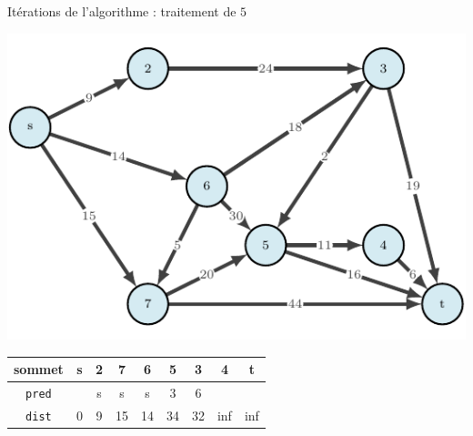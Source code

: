 \begin{frame}{Itérations de l'algorithme : traitement de $5$}
    \begin{center}
        \includegraphics[height=.6\textheight]{fig/ordinal-0.pdf}      
    \begin{tabular}{c|cccccccc}
        
        sommet & s       &2      &7      &6      &5      &3      &4      &t      \\
        \hline
        \texttt{pred} & &s      &s      &s      &3      &6      &       &       \\
        \texttt{dist} & 0       &9      &15     &14     &34     &32     &inf    &inf    \\
    \end{tabular}
\end{center}
\end{frame}

